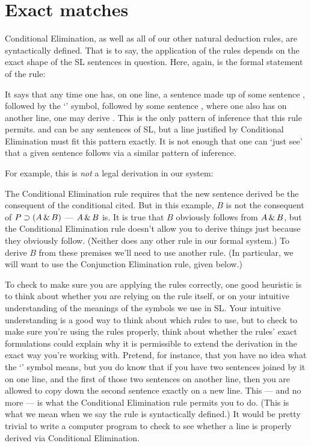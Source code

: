 \section{Exact matches}

Conditional Elimination, as well as all of our other natural deduction rules, are syntactically defined. That is to say, the application of the rules depends on the exact shape of the SL sentences in question. Here, again, is the formal statement of the rule:

\begin{ndproof}
	\metaA{}
	\metaB{} 
\end{ndproof}

It says that any time one has, on one line, a sentence made up of some sentence \metaA{}, followed by the `\eif' symbol, followed by some sentence \metaB{}, where one also has \metaA{} on another line, one may derive \metaB{}. This is the only pattern of inference that this rule permits. \metaA{} and \metaB{} can be any sentences of SL, but a line justified by Conditional Elimination must fit this pattern exactly. It is not enough that one can `just see' that a given sentence follows via a similar pattern of inference.

For example, this is \emph{not} a legal derivation in our system:

\begin{ndproof}
\end{ndproof}

The Conditional Elimination rule requires that the new sentence derived be the consequent of the conditional cited. But in this example, $B$ is not the consequent of $P\supset (A \,\&\, B)$ --- $A \,\&\, B$ is. It is true that $B$ obviously follows from $A \,\&\, B$, but the Conditional Elimination rule doesn't allow you to derive things just because they obviously follow. (Neither does any other rule in our formal system.) To derive $B$ from these premises we'll need to use another rule. (In particular, we will want to use the Conjunction Elimination rule, given below.)

To check to make sure you are applying the rules correctly, one good heuristic is to think about whether you are relying on the rule itself, or on your intuitive understanding of the meanings of the symbols we use in SL. Your intuitive understanding is a good way to think about which rules to use, but to check to make sure you're using the rules properly, think about whether the rules' exact formulations could explain why it is permissible to extend the derivation in the exact way you're working with. Pretend, for instance, that you have no idea what the `\eif' symbol means, but you do know that if you have two sentences joined by it on one line, and the first of those two sentences on another line, then you are allowed to copy down the second sentence exactly on a new line. This --- and no more --- is what the Conditional Elimination rule permits you to do. (This is what we mean when we say the rule is syntactically defined.) It would be pretty trivial to write a computer program to check to see whether a line is properly derived via Conditional Elimination.

